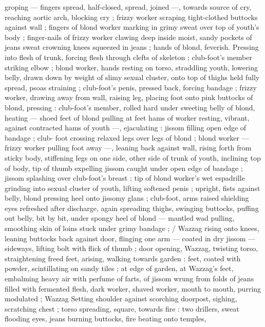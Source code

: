 {groping --- fingers spread, half-closed, spread, joined ---, towards 
source of cry, reaching aortic arch, blocking cry ; frizzy worker 
scraping tight-clothed buttocks against wall ; fingers of blond worker 
marking in grimy sweat over top of youth's body ; finger-nails of 
frizzy worker clawing deep inside moist, sandy pockets of jeans 
sweat crowning knees squeezed in jeans ; hands of blond, feverish. 
Pressing into flesh of trunk, forcing flesh through clefts of skeleton 
; club-foot's member striking elbow ; blond worker, hands resting on 
torso, straddling youth, lowering belly, drawn down by weight of 
slimy sexual cluster, onto top of thighs held fully spread, psoas 
straining ; club-foot's penis, pressed back, forcing bandage ; frizzy 
worker, drawing away from wall, raising leg, placing foot onto pink 
buttocks of blond, pressing : club-foot's member, rolled hard under 
sweeting belly of blond, heating --- shoed feet of blond pulling at 
feet hams of worker resting, vibrant, against contracted hams of 
youth ---, ejaculating : jissom filling open edge of bandage ; club- 
foot crossing relaxed legs over legs of blond ; blond worker --- frizzy 
worker pulling foot away ---, leaning back against wall, rising forth 
from sticky body, stiffening legs on one side, other side of trunk of 
youth, inclining top of body, tip of thumb expelling jissom caught 
under open edge of bandage ; jissom splashing over club-foot's 
breast ; tip of blond worker's wet espadrille grinding into sexual 
cluster of youth, lifting softened penis ; upright, fists against belly, 
blond pressing heel onto jissomy glans ; club-foot, arms raised 
shielding eyes refreshed after discharge, again spreading thighs, 
swinging buttocks, puffing out belly, bit by bit, under spongy heel of 
blond --- mantled wad pulling, smoothing skin of loins stuck under 
grimy bandage ; {\slash} Wazzag rising onto knees, leaning buttocks back 
against door, flinging one arm --- coated in dry jissom --- sideways, 
lifting bolt with flick of thumb ; door opening, Wazzag, twisting torso, 
straightening freed feet, arising, walking towards garden : feet, 
coated with powder, scintillating on sandy tiles ; at edge of garden, 
at Wazzag's feet, embalming heavy air with perfume of farts, of 
jissom wrung from folds of jeans filled with fermented flesh, dark 
worker, shaved worker, mouth to mouth, purring modulated ; Wazzag 
Setting shoulder against scorching doorpost, sighing, scratching 
chest ; torso spreading, square, towards fire : two drillers, sweat 
flooding eyes, jeans burning buttocks, fire beating onto temples, 
}
